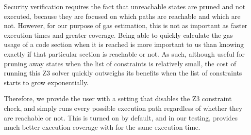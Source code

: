 Security verification requires the fact that unreachable states are pruned and not executed, because 
they are focused on which paths are reachable and which are not. However, for our purpose of gas estimation,
this is not as important as faster execution times and greater coverage. Being able to quickly calculate the gas usage of a code section 
when it is reached is more important to us than knowing exactly if that particular section is reachable or not.
As such, although useful for pruning away states when the list of constraints is relatively small, the cost of
running this Z3 solver quickly outweighs its benefits when the list of constraints starts to grow exponentially.

Therefore, we provide the user with a setting that disables the Z3 constraint check, and simply runs
every possible execution path regardless of whether they are reachable or not. This is turned on by default,
and in our testing, provides much better execution coverage with for the same execution time.